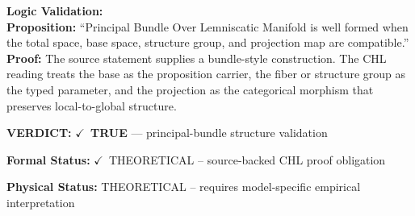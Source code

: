 \textbf{Logic Validation:}\\
\textbf{Proposition:} ``Principal Bundle Over Lemniscatic Manifold is well formed when the total space, base
space, structure group, and projection map are compatible.''\\
\textbf{Proof:} The source statement supplies a bundle-style construction. The CHL reading treats the
base as the proposition carrier, the fiber or structure group as the typed parameter,
and the projection as the categorical morphism that preserves local-to-global structure.

\textbf{VERDICT:} \ensuremath{\checkmark}\ \textbf{TRUE} --- principal-bundle structure validation

\textbf{Formal Status:} \ensuremath{\checkmark}\ THEORETICAL -- source-backed CHL proof obligation

\textbf{Physical Status:} THEORETICAL -- requires model-specific empirical interpretation
\par\vspace{0.45em}
\par
\ifTZPDarkEdition
{}
\fi
\endgroup
\endgroup
